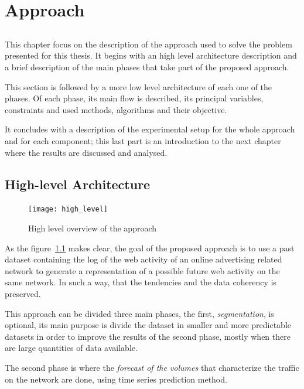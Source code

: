 \chapter{Approach}\label{chap:chap4}

\section*{}
This chapter focus on the description of the approach used to solve the
problem presented for this thesis. It begins with an high level architecture
description and a brief description of the main phases that take part of the
proposed approach.

This section is followed by a more low level architecture of each one of the phases.
Of each phase, its main flow is described, its principal variables, constraints and
used methods, algorithms and their objective.

It concludes with a description of the experimental setup for the whole approach
and for each component; this last part is an introduction to the next
chapter where the results are discussed and analysed.

\section{High-level Architecture}

\begin{figure}[h] \begin{center} \leavevmode
\texttt{[image: high\_level]} \caption{ High level overview
of the approach } \label{fig:highlevel_arch} \end{center} \end{figure}

As the figure~\ref{fig:highlevel_arch} makes clear, the goal of the
proposed approach is to use a past dataset containing the log of the web
activity of an online advertising related network to generate a representation of a
possible future web activity on the same network. In such a way, that the
tendencies and the data coherency is preserved.

This approach can be divided three main phases, the first, \emph{segmentation}, is
optional, its main purpose is divide the dataset in smaller and more predictable
datasets in order to improve the results of the second phase, mostly when there
are large quantities of data available.

The second phase is where the \emph{forecast of the volumes} that characterize the traffic on
the network are done, using time series prediction method.

